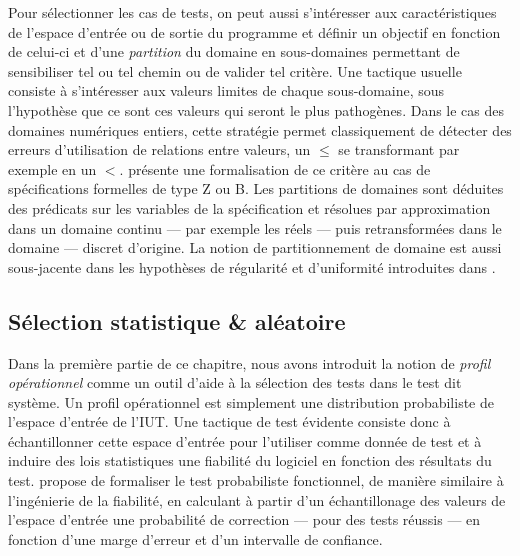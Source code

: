 Pour s\'electionner les cas de tests, on peut aussi s'int\'eresser
aux caract\'eristiques de l'espace d'entr\'ee ou de sortie du
programme et d\'efinir un objectif en fonction de celui-ci et d'une
\emph{partition}  du domaine en sous-domaines permettant de
sensibiliser tel ou tel chemin ou de valider tel crit\`ere. Une tactique usuelle consiste \`a s'int\'eresser
aux valeurs limites de chaque sous-domaine, sous l'hypoth\`ese que ce
sont ces valeurs qui seront le plus pathog\`enes. Dans le cas des
domaines num\'eriques entiers,  cette strat\'egie permet
classiquement de d\'etecter des erreurs d'utilisation de relations
entre valeurs, un $\leq$ se transformant par exemple en un
$<$. \cite{kosmatov-boundary-issre04} pr\'esente une formalisation de
ce crit\`ere au cas de sp\'ecifications formelles de type \textsf{Z}
ou \textsf{B}. Les partitions de domaines sont d\'eduites des
pr\'edicats sur les variables de la sp\'ecification et r\'esolues
par approximation dans un domaine continu --- par exemple les r\'eels
--- puis retransform\'ees dans le domaine --- discret
d'origine. 
La notion de partitionnement de domaine est aussi sous-jacente dans
les hypoth\`eses de r\'egularit\'e et d'uniformit\'e introduites
dans \cite{gaudel}.

\subsection{S\'election statistique \& al\'eatoire}

Dans la premi\`ere partie de ce chapitre, nous avons introduit la
notion de \emph{profil op\'erationnel} comme un outil d'aide \`a la
s\'election des tests dans le test dit syst\`eme. Un profil
op\'erationnel est simplement une distribution probabiliste de
l'espace d'entr\'ee de l'\textsf{IUT}. Une tactique de test \'evidente
consiste donc \`a \'echantillonner cette espace d'entr\'ee pour
l'utiliser comme donn\'ee de test et \`a
induire des lois  statistiques une fiabilit\'e du logiciel en
fonction des r\'esultats du test. \cite{thprobtest} propose de formaliser le test
probabiliste fonctionnel, de mani\`ere similaire \`a
l'ing\'enierie de la fiabilit\'e, en calculant \`a partir d'un
\'echantillonage des valeurs de l'espace d'entr\'ee une
probabilit\'e de correction --- pour des tests r\'eussis --- en
fonction d'une marge d'erreur et d'un intervalle de confiance. 

